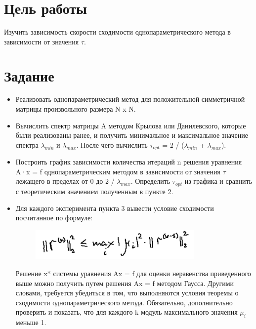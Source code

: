 \documentclass[a4paper, 14pt]{extarticle}
\begin{document}
\renewcommand{\ttdefault}{pcr}

\setlength{\tabcolsep}{3pt}
\newpage
\setcounter{page}{2}

\section{Цель работы}\label{Sect::goal}

Изучить зависимость скорости сходимости однопараметрического метода в зависимости от значения $\tau$.

\section{Задание}\label{Sect::task}

\begin{itemize}
    \item Реализовать однопараметрический метод для положительной симметричной матрицы произвольного размера N x N.
    \item Вычислить спектр матрицы A методом Крылова или Данилевского, которые были реализованы ранее, и получить минимальное и максимальное значение спектра $\lambda_{min}$ и $\lambda_{max}$. После чего вычислить $\tau_{opt}$ = 2 / ($\lambda_{min}$ + $\lambda_{max}$).
    \item Построить график зависимости количества итераций n решения уравнения A·x = f однопараметрическим методом в зависимости от значения $\tau$ лежащего в пределах от 0 до 2 / $\lambda_{max}$. Определить $\tau_{opt}$ из графика и сравнить с теоретическим значением полученным в пункте 2.
    \item Для каждого эксперимента пункта 3 вывести условие сходимости посчитанное по формуле:
          \begin{figure}[!htb]
              \centering
              \includegraphics[width=0.8\textwidth]{img4}
          \label{fig:img4}
          \end{figure}

          Решение x* системы уравнения Ax = f для оценки неравенства приведенного выше можно получить путем решения Ax = f методом Гаусса. Другими словами, требуется убедиться в том, что выполняются условия теоремы о сходимости однопараметрического метода. Обязательно, дополнительно проверить и показать, что для каждого k модуль максимального значения $\mu_i$ меньше 1.
\end{itemize}
\end{document}
